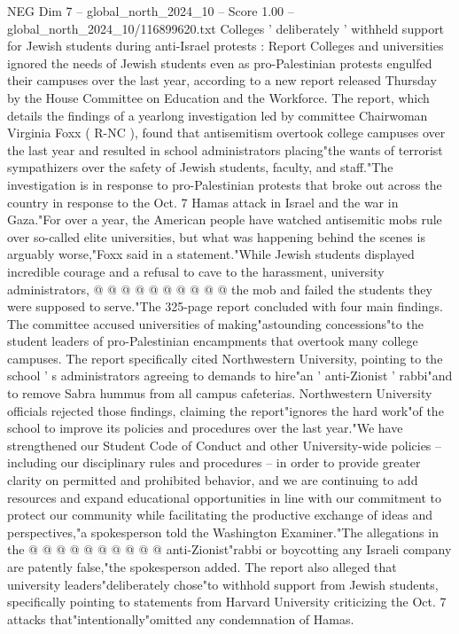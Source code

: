 \begin{textsample}{NEG Dim 7 – global\_north\_2024\_10 – Score 1.00 – global\_north\_2024\_10/116899620.txt}  \label{ex:f7_neg_364}
Colleges ' deliberately ' withheld support for Jewish students during anti-Israel protests : Report Colleges and universities ignored the needs of Jewish students even as pro-Palestinian protests engulfed their campuses over the last year, according to a new report released Thursday by the House Committee on Education and the Workforce.
The report, which details the findings of a yearlong investigation led by committee Chairwoman Virginia Foxx ( R-NC ), found that antisemitism overtook college campuses over the last year and resulted in school administrators placing"the wants of terrorist sympathizers over the safety of Jewish students, faculty, and staff."The investigation is in response to pro-Palestinian protests that broke out across the country in response to the Oct. 7 Hamas attack in Israel and the war in Gaza."For over a year, the American people have watched antisemitic mobs rule over so-called elite universities, but what was happening behind the scenes is arguably worse,"Foxx said in a statement."While Jewish students displayed incredible courage and a refusal to cave to the harassment, university administrators, @ @ @ @ @ @ @ @ @ @ the mob and failed the students they were supposed to serve."The 325-page report concluded with four main findings.
The committee accused universities of making"astounding concessions"to the student leaders of pro-Palestinian encampments that overtook many college campuses.
The report specifically cited Northwestern University, pointing to the school ' s administrators agreeing to demands to hire"an ' anti-Zionist ' rabbi"and to remove Sabra hummus from all campus cafeterias.
Northwestern University officials rejected those findings, claiming the report"ignores the hard work"of the school to improve its policies and procedures over the last year."We have strengthened our Student Code of Conduct and other University-wide policies -- including our disciplinary rules and procedures -- in order to provide greater clarity on permitted and prohibited behavior, and we are continuing to add resources and expand educational opportunities in line with our commitment to protect our community while facilitating the productive exchange of ideas and perspectives,"a spokesperson told the Washington Examiner."The allegations in the @ @ @ @ @ @ @ @ @ @ anti-Zionist"rabbi or boycotting any Israeli company are patently false,"the spokesperson added.
The report also alleged that university leaders"deliberately chose"to withhold support from Jewish students, specifically pointing to statements from Harvard University criticizing the Oct. 7 attacks that"intentionally"omitted any condemnation of Hamas.

\end{textsample}
